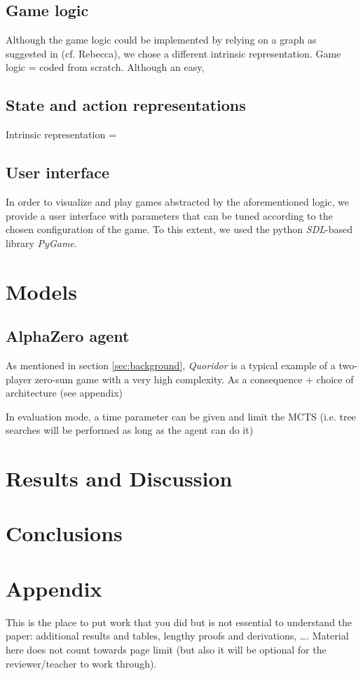 \documentclass[journal, a4paper]{IEEEtran}
\begin{document}
\subsection{Game logic}
Although the game logic could be implemented by relying on a graph as suggested in (cf. Rebecca), we chose a different intrinsic representation.
Game logic = coded from scratch. Although an easy, 

\subsection{State and action representations}
Intrinsic representation = 

\subsection{User interface}
In order to visualize and play games abstracted by the aforementioned logic, we provide a user interface with parameters that can be tuned according to the chosen configuration of the game. To this extent, we used the python \textit{SDL}-based library \textit{PyGame}\cite{pygame}.


\section{Models}
\label{sec:models}

\subsection{AlphaZero agent}

As mentioned in section \ref{sec:background}, \textit{Quoridor} is a typical example of a two-player zero-sum game with a very high complexity. As a consequence
+ choice of architecture (see appendix)

In evaluation mode, a time parameter can be given and limit the MCTS (i.e. tree searches will be performed as long as the agent can do it)


\section{Results and Discussion}
\label{sec:results}


\section{Conclusions}
\label{sec:conclusion}




\newpage
\section*{Appendix}
This is the place to put work that you did but is not essential to understand the paper: additional results and tables, lengthy proofs and derivations, \ldots. Material here does not count towards page limit (but also it will be optional for the reviewer/teacher to work through). 
\end{document}
